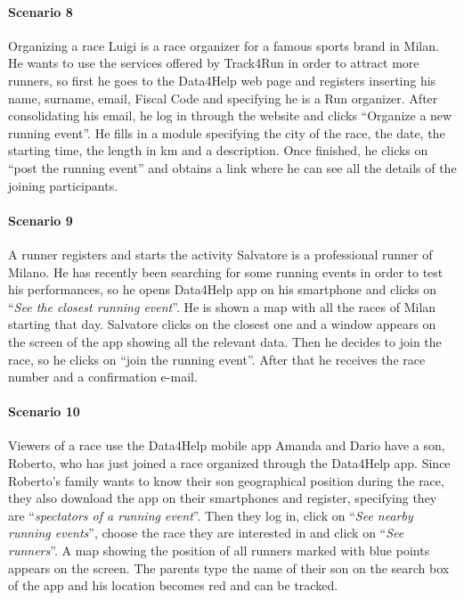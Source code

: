 \paragraph{Scenario 8} Organizing a race \newline
Luigi is a race organizer for a famous sports brand in Milan. He wants to use the services offered by Track4Run in order to attract more runners, so first he goes to the Data4Help web page and registers inserting his name, surname, email, Fiscal Code and specifying he is a Run organizer. After consolidating his email, he log in through the website and clicks “Organize a new running event”. He fills in a module specifying the city of the race, the date, the starting time, the length in km and a description. Once finished, he clicks on “post the running event” and obtains a link where he can see all the details of the joining participants.



\paragraph{Scenario 9} A runner registers and starts the activity \newline
Salvatore is a professional runner of Milano.  He has recently been searching for some running events in order to test his performances, so he opens Data4Help app on his smartphone and clicks on “\textit{See the closest running event}”.
He is shown a map with all the races of Milan starting that day. Salvatore clicks on the closest one and a window appears on the screen of the app showing all the relevant data. Then he decides to join the race, so he clicks on “join the running event”. After that he receives the race number and a confirmation e-mail.



\paragraph{Scenario 10} Viewers of a race use the Data4Help mobile app \newline
Amanda and Dario have a son, Roberto, who has just joined a race organized through the Data4Help app. Since Roberto’s family wants to know their son geographical position during the race, they also download the app on their smartphones and register, specifying they are “\textit{spectators of a running event}”. Then they log in, click on “\textit{See nearby running events}”, choose the race they are interested in and click on “\textit{See runners}”. A map showing the position of all runners marked with blue points appears on the screen. The parents type the name of their son on the search box of the app and  his location becomes red and can be tracked.
